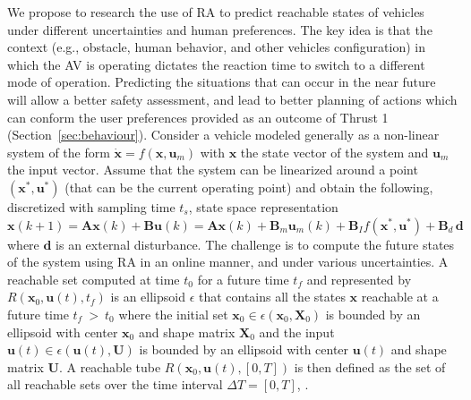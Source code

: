 We propose to research the use of RA to predict reachable states of vehicles under different uncertainties and human preferences. The key idea is that the context (e.g., obstacle, human behavior, and other vehicles configuration) in which the AV is operating dictates the reaction time to switch to a different mode of operation. 
Predicting the situations that can occur in the near future will allow a better safety assessment, and lead to better planning of actions which can conform the user preferences provided as an outcome of Thrust 1 (Section~\ref{sec:behaviour}).
Consider a vehicle modeled generally as a non-linear system of the form $\dot{\bm{x}} = f(\bm{x}, \bm{u}_m)$ with $\bm{x}$ the state vector of the system and $\bm{u}_m$ the input vector.
Assume that the system can be linearized around a point $\left(\bm{x}^{*}, \bm{u}^{*}\right)$ (that can be the current operating point) and obtain the following, discretized with sampling time $t_s$, state space representation $\bm{x}(k+1) =  \bm{A} \bm{x}(k) + \bm{B} \bm{u}(k) =  \bm{A} \bm{x}(k) + \bm{B}_m \bm{u}_m(k) + \bm{B}_I f\left(\bm{x}^{*}, \bm{u}^{*}\right) + \bm{B}_d \, \bm{d}$
where $\bm{d}$ is an external disturbance.  %
The challenge is to compute the future states of the system using RA in an online manner, and under various uncertainties.
A reachable set computed at time $t_0$ for a future time $ t_f $ and represented by $R(\bm{x}_0, \bm{u}(t), t_f)$ is an ellipsoid $\epsilon$ that contains all the states $\bm{x}$ reachable at a future time $t_f ~>~ t_0$ where the initial set $ \bm{x}_0 \in \epsilon(\bm{x}_0, \bm{X}_0)$ is bounded by an ellipsoid with center $\bm{x}_0 $ and shape matrix $ \bm{X}_0 $ and the input $ \bm{u}(t) \in \epsilon(\bm{u}(t), \bm{U}) $ is bounded by an ellipsoid with center $ \bm{u}(t) $ and shape matrix $ \bm{U} $. 
A reachable tube $ R(\bm{x}_0, \bm{u}(t), [0,T] ) $ is then defined as the set of all reachable sets over the time interval $\Delta T = [0,T]$, \cite{esen17AHS, VaraiyaEllipsoid2006}. 
